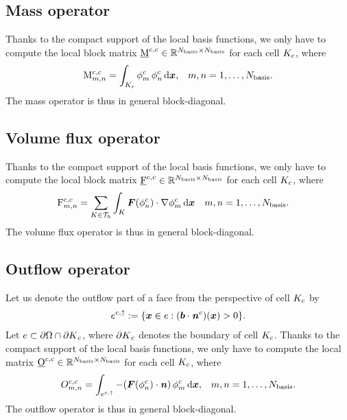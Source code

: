 \documentclass{scrreprt}
\begin{document}
\subsection{Mass operator}
Thanks to the compact support of the local basis functions,
we only have to compute the local block matrix
$\underline{\mathrm{M}}^{c,c} \in \mathbb{R}^{N_\textup{basis} \times N_\textup{basis}}$ for each
cell $K_c$, where
\begin{align}
\mathrm{M}^{c,c}_{m,n} =
\int_{K_c}
\phi^{c}_{m}\,\phi^{c}_{n} \, \text{d}{\boldsymbol x},
 && m,n = 1,\ldots,N_\textup{basis}.
\end{align}
The mass operator is thus in general block-diagonal.
\subsection{Volume flux operator}
Thanks to the compact support of the local basis functions,
we only have to compute the local block matrix
$\underline{\mathrm{F}}^{c,c} \in \mathbb{R}^{N_\textup{basis} \times N_\textup{basis}}$ for each
cell $K_c$, where
\begin{align}
\label{eq:volume_flux_op}
\mathrm{F}^{c,c}_{m,n} &= \sum_{K \in \mathcal{T}_h} \int_K {\boldsymbol F}(\phi^{c}_{n}) \cdot
\nabla \phi^{c}_{m}\,\text{d}{\boldsymbol x}
&& m,n = 1,\ldots,N_\textup{basis}.
\end{align}
The volume flux operator is thus in general block-diagonal.
\subsection{Outflow operator}
Let us denote the outflow part of a face from the perspective of cell $K_c$
by
\begin{align}
e^{c,\uparrow} := \{ {\boldsymbol x} \in e : ({\boldsymbol b} \cdot
{\boldsymbol {\mathit{n}}}^{{c}})({\boldsymbol x})> 0\}.
\end{align}
Let $e \subset {\partial\Omega} \cap {\partial K}_c$, where ${\partial K}_c$
denotes the boundary of cell $K_c$.
Thanks to the compact support of the local basis functions, we only
have to compute the local matrix $\underline{\mathrm{O}}^{c,c} \in \mathbb{R}^{N_\textup{basis}
\times N_\textup{basis}}$ for each cell $K_c$, where
\begin{align}
O^{c,c}_{m,n} =
\int_{e^{c,\uparrow}}
-
({\boldsymbol F}(\phi^{c}_{n})\cdot{\boldsymbol {\mathit{n}}})\,\phi^{c}_{m} \, \text{d}{\boldsymbol x},
 && m,n = 1,\ldots,N_\textup{basis}.
\end{align}
The outflow operator is thus in general block-diagonal.
\end{document}

